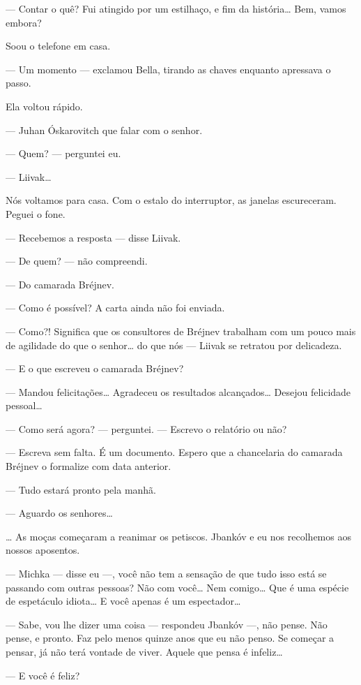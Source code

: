 --- Contar o quê? Fui atingido por um estilhaço, e fim da
história\ldots{} Bem, vamos embora?

Soou o telefone em casa.

--- Um momento --- exclamou Bella, tirando as chaves
enquanto apressava o passo.

Ela voltou rápido.

--- Juhan Óskarovitch que falar com o senhor.

--- Quem? --- perguntei eu.

--- Liivak\ldots{}

Nós voltamos para casa. Com o estalo do interruptor, as janelas
escureceram. Peguei o fone.

--- Recebemos a resposta --- disse Liivak.

--- De quem? --- não compreendi.

--- Do camarada Bréjnev.

--- Como é possível? A carta ainda não foi enviada.

--- Como?! Significa que os consultores de Bréjnev trabalham com
um pouco mais de agilidade do que o senhor\ldots{} do que nós ---
Liivak se retratou por delicadeza.

--- E o que escreveu o camarada Bréjnev?

--- Mandou felicitações\ldots{} Agradeceu os resultados alcançados\ldots{}
Desejou felicidade pessoal\ldots{}

--- Como será agora? --- perguntei. --- Escrevo o
relatório ou não?

--- Escreva sem falta. É um documento. Espero que a chancelaria
do camarada Bréjnev o formalize com data anterior.

--- Tudo estará pronto pela manhã.

--- Aguardo os senhores\ldots{}

\ldots{} As moças começaram a reanimar os petiscos. Jbankóv e eu nos
recolhemos aos nossos aposentos.

--- Michka --- disse eu ---, você não tem a sensação
de que tudo isso está se passando com outras pessoas? Não com você\ldots{}
Nem comigo\ldots{} Que é uma espécie de espetáculo idiota\ldots{} E você apenas é
um espectador\ldots{}

--- Sabe, vou lhe dizer uma coisa --- respondeu Jbankóv
---, não pense. Não pense, e pronto. Faz pelo menos quinze anos
que eu não penso. Se começar a pensar, já não terá vontade de viver.
Aquele que pensa é infeliz\ldots{}

--- E você é feliz?

